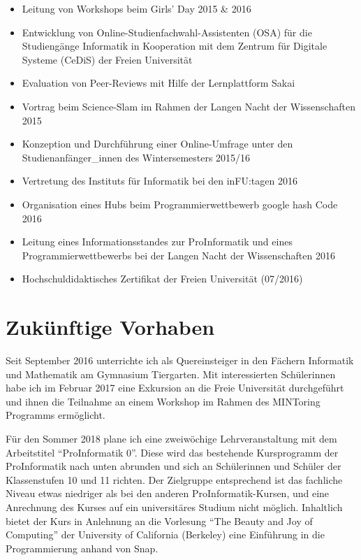 \documentclass[11pt,ngerman]{article}
\begin{document}
\begin{itemize}
\item Leitung von Workshops beim Girls' Day 2015 \& 2016
\item Entwicklung von Online-Studienfachwahl-Assistenten (OSA) für die Studiengänge Informatik in Kooperation mit dem Zentrum für Digitale Systeme (CeDiS) der Freien Universität
\item Evaluation von Peer-Reviews mit Hilfe der Lernplattform Sakai
\item Vortrag beim Science-Slam im Rahmen der Langen Nacht der Wissenschaften 2015
\item Konzeption und Durchführung einer Online-Umfrage unter den Studienanfänger\_innen des Wintersemesters 2015/16
\item Vertretung des Instituts für Informatik bei den inFU:tagen 2016
\item Organisation eines Hubs beim Programmierwettbewerb google hash Code 2016
\item Leitung eines Informationsstandes zur ProInformatik und eines Programmierwettbewerbs bei der Langen Nacht der Wissenschaften 2016
\item Hochschuldidaktisches Zertifikat der Freien Universität (07/2016)
\end{itemize}

\section{Zukünftige Vorhaben}

Seit September 2016 unterrichte ich als Quereinsteiger in den Fächern Informatik und Mathematik am Gymnasium Tiergarten. Mit interessierten Schülerinnen habe ich im Februar 2017 eine Exkursion an die Freie Universität durchgeführt und ihnen die Teilnahme an einem Workshop im Rahmen des MINToring Programms ermöglicht. 

Für den Sommer 2018 plane ich eine zweiwöchige Lehrveranstaltung mit dem Arbeitstitel ``ProInformatik 0''. Diese wird das bestehende Kursprogramm der ProInformatik nach unten abrunden und sich an Schülerinnen und Schüler der Klassenstufen 10 und 11 richten. Der Zielgruppe entsprechend ist das fachliche Niveau etwas niedriger als bei den anderen ProInformatik-Kursen, und eine Anrechnung des Kurses auf ein universitäres Studium nicht möglich. Inhaltlich bietet der Kurs in Anlehnung an die Vorlesung ``The Beauty and Joy of Computing'' der University of California (Berkeley) eine Einführung in die Programmierung anhand von Snap.
\end{document}
